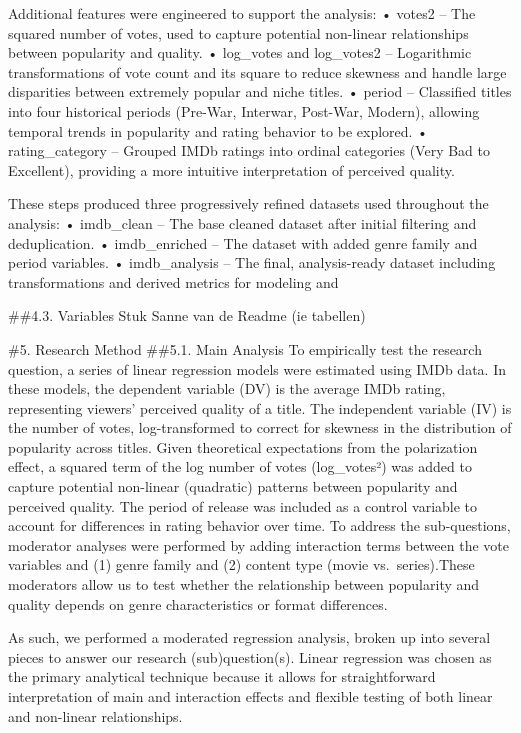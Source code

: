 \documentclass[
  11pt,
]{article}
\begin{document}
Additional features were engineered to support the analysis: • votes2 --
The squared number of votes, used to capture potential non-linear
relationships between popularity and quality. • log\_votes and
log\_votes2 -- Logarithmic transformations of vote count and its square
to reduce skewness and handle large disparities between extremely
popular and niche titles. • period -- Classified titles into four
historical periods (Pre-War, Interwar, Post-War, Modern), allowing
temporal trends in popularity and rating behavior to be explored. •
rating\_category -- Grouped IMDb ratings into ordinal categories (Very
Bad to Excellent), providing a more intuitive interpretation of
perceived quality.

These steps produced three progressively refined datasets used
throughout the analysis: • imdb\_clean -- The base cleaned dataset after
initial filtering and deduplication. • imdb\_enriched -- The dataset
with added genre family and period variables. • imdb\_analysis -- The
final, analysis-ready dataset including transformations and derived
metrics for modeling and

\#\#4.3. Variables Stuk Sanne van de Readme (ie tabellen)

\#5. Research Method \#\#5.1. Main Analysis To empirically test the
research question, a series of linear regression models were estimated
using IMDb data. In these models, the dependent variable (DV) is the
average IMDb rating, representing viewers' perceived quality of a title.
The independent variable (IV) is the number of votes, log-transformed to
correct for skewness in the distribution of popularity across titles.
Given theoretical expectations from the polarization effect, a squared
term of the log number of votes (log\_votes²) was added to capture
potential non-linear (quadratic) patterns between popularity and
perceived quality. The period of release was included as a control
variable to account for differences in rating behavior over time. To
address the sub-questions, moderator analyses were performed by adding
interaction terms between the vote variables and (1) genre family and
(2) content type (movie vs.~series).These moderators allow us to test
whether the relationship between popularity and quality depends on genre
characteristics or format differences.

As such, we performed a moderated regression analysis, broken up into
several pieces to answer our research (sub)question(s). Linear
regression was chosen as the primary analytical technique because it
allows for straightforward interpretation of main and interaction
effects and flexible testing of both linear and non-linear
relationships.
\end{document}

